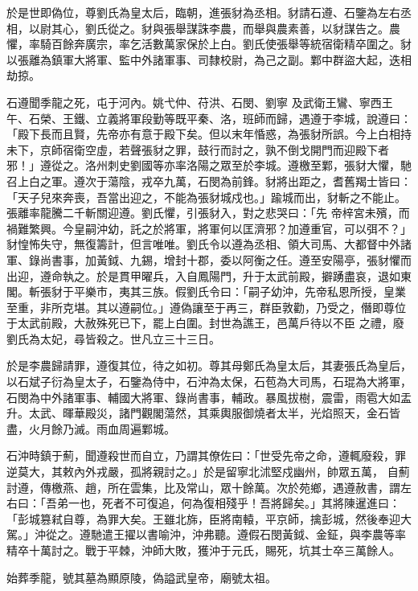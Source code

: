 \begin{pinyinscope}
 於是世即偽位，尊劉氏為皇太后，臨朝，進張豺為丞相。豺請石遵、石鑒為左右丞相，以尉其心，劉氏從之。豺與張舉謀誅李農，而舉與農素善，以豺謀告之。農懼，率騎百餘奔廣宗，率乞活數萬家保於上白。劉氏使張舉等統宿衛精卒圍之。豺以張離為鎮軍大將軍、監中外諸軍事、司隸校尉，為己之副。鄴中群盜大起，迭相劫掠。



 石遵聞季龍之死，屯于河內。姚弋仲、苻洪、石閔、劉寧
 及武衛王鸞、寧西王午、石榮、王鐵、立義將軍段勤等既平秦、洛，班師而歸，遇遵于李城，說遵曰：「殿下長而且賢，先帝亦有意于殿下矣。但以末年惛惑，為張豺所誤。今上白相持未下，京師宿衛空虛，若聲張豺之罪，鼓行而討之，孰不倒戈開門而迎殿下者邪！」遵從之。洛州刺史劉國等亦率洛陽之眾至於李城。遵檄至鄴，張豺大懼，馳召上白之軍。遵次于蕩陰，戎卒九萬，石閔為前鋒。豺將出距之，耆舊羯士皆曰：「天子兒來奔喪，吾當出迎之，不能為張豺城戍也。」踰城而出，豺斬之不能止。張離率龍騰二千斬關迎遵。劉氏懼，引張豺入，對之悲哭曰：「先
 帝梓宮未殯，而禍難繁興。今皇嗣沖幼，託之於將軍，將軍何以匡濟邪？加遵重官，可以弭不？」豺惶怖失守，無復籌計，但言唯唯。劉氏令以遵為丞相、領大司馬、大都督中外諸軍、錄尚書事，加黃鉞、九錫，增封十郡，委以阿衡之任。遵至安陽亭，張豺懼而出迎，遵命執之。於是貫甲曜兵，入自鳳陽門，升于太武前殿，擗踴盡哀，退如東閣。斬張豺于平樂市，夷其三族。假劉氏令曰：「嗣子幼沖，先帝私恩所授，皇業至重，非所克堪。其以遵嗣位。」遵偽讓至于再三，群臣敦勸，乃受之，僭即尊位于太武前殿，大赦殊死已下，罷上白圍。封世為譙王，邑萬戶待以不臣
 之禮，廢劉氏為太妃，尋皆殺之。世凡立三十三日。



 於是李農歸請罪，遵復其位，待之如初。尊其母鄭氏為皇太后，其妻張氏為皇后，以石斌子衍為皇太子，石鑒為侍中，石沖為太保，石苞為大司馬，石琨為大將軍，石閔為中外諸軍事、輔國大將軍、錄尚書事，輔政。暴風拔樹，震雷，雨雹大如盂升。太武、暉華殿災，諸門觀閣蕩然，其乘輿服御燒者太半，光焰照天，金石皆盡，火月餘乃滅。雨血周遍鄴城。



 石沖時鎮于薊，聞遵殺世而自立，乃謂其僚佐曰：「世受先帝之命，遵輒廢殺，罪逆莫大，其敕內外戎嚴，孤將親討之。」於是留寧北沭堅戍幽州，帥眾五萬，
 自薊討遵，傳檄燕、趙，所在雲集，比及常山，眾十餘萬。次於苑鄉，遇遵赦書，謂左右曰：「吾弟一也，死者不可復追，何為復相殘乎！吾將歸矣。」其將陳暹進曰：「彭城篡弒自尊，為罪大矣。王雖北旆，臣將南轅，平京師，擒彭城，然後奉迎大駕。」沖從之。遵馳遣王擢以書喻沖，沖弗聽。遵假石閔黃鉞、金鉦，與李農等率精卒十萬討之。戰于平棘，沖師大敗，獲沖于元氏，賜死，坑其士卒三萬餘人。



 始葬季龍，號其墓為顯原陵，偽謚武皇帝，廟號太祖。




\end{pinyinscope}
